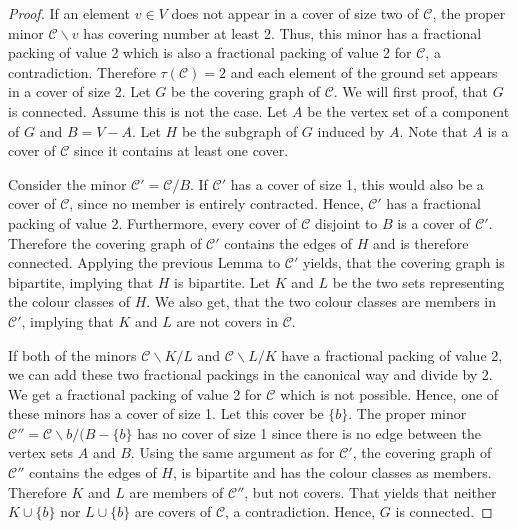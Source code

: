 \documentclass[a4paper, 12pt, twoside=false]{scrbook}
\theoremstyle{definition}
\begin{document}
   \begin{proof}
       If an element $v \in V$ does not appear in a cover of size two of $\mathcal{C}$, the proper minor $\mathcal{C} \backslash v$ has covering number at least 2.
       Thus, this minor has a fractional packing of value 2 which is also a fractional packing of value 2 for $\mathcal{C}$, a contradiction.
       Therefore $\tau(\mathcal{C}) = 2$ and each element of the ground set appears in a cover of size 2.
       Let $G$ be the covering graph of $\mathcal{C}$.
       We will first proof, that $G$ is connected.
       Assume this is not the case.
       Let $A$ be the vertex set of a component of $G$ and $B = V - A$.
       Let $H$ be the subgraph of $G$ induced by $A$.
       Note that $A$ is a cover of $\mathcal{C}$ since it contains at least one cover.

       Consider the minor $\mathcal{C'}=\mathcal{C}/B$.
       If $\mathcal{C'}$ has a cover of size 1, this would also be a cover of $\mathcal{C}$, since no member is entirely contracted.
       Hence, $\mathcal{C'}$ has a fractional packing of value 2.
       Furthermore, every cover of $\mathcal{C}$ disjoint to $B$ is a cover of $\mathcal{C'}$.
       Therefore the covering graph of $\mathcal{C'}$ contains the edges of $H$ and is therefore connected.
       Applying the previous Lemma to $\mathcal{C'}$ yields, that the covering graph is bipartite, implying that $H$ is bipartite.
       Let $K$ and $L$ be the two sets representing the colour classes of $H$.
       We also get, that the two colour classes are members in $\mathcal{C'}$, implying that $K$ and $L$ are not covers in $\mathcal{C}$.

       If both of the minors $\mathcal{C} \backslash K / L$ and $\mathcal{C} \backslash L / K$ have a fractional packing of value 2, we can add these two fractional packings in the canonical way and divide by 2.
       We get a fractional packing of value 2 for $\mathcal{C}$ which is not possible.
       Hence, one of these minors has a cover of size 1.
       Let this cover be $\{b\}$.
       The proper minor $\mathcal{C''}=\mathcal{C} \backslash b / (B-\{b\}$ has no cover of size 1 since there is no edge between the vertex sets $A$ and $B$.
       Using the same argument as for $\mathcal{C'}$, the covering graph of $\mathcal{C''}$ contains the edges of $H$, is bipartite and has the colour classes as members.
       Therefore $K$ and $L$ are members of $\mathcal{C''}$, but not covers.
       That yields that neither $K \cup \{b\}$ nor $L \cup \{b\}$ are covers of $\mathcal{C}$, a contradiction.
       Hence, $G$ is connected.


\end{proof}
\end{document}

